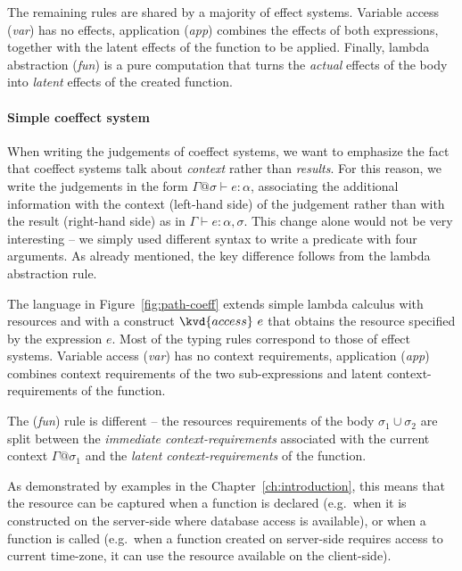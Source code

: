 The remaining rules are shared by a majority of effect systems. Variable access (\emph{var}) 
has no effects, application (\emph{app}) combines the effects of both expressions, together with 
the latent effects of the function to be applied. Finally, lambda abstraction (\emph{fun}) is a
pure computation that turns the \emph{actual} effects of the body into \emph{latent} effects of 
the created function.


\paragraph{Simple coeffect system}
When writing the judgements of coeffect systems, we want to emphasize the fact that coeffect 
systems talk about \emph{context} rather than \emph{results}. For this reason, we write the 
judgements in the form $\Gamma @ \sigma \vdash e : \alpha$, associating the additional information
with the context (left-hand side) of the judgement rather than with the result (right-hand side)
as in $\Gamma \vdash e : \alpha, \sigma$. This change alone would not be very interesting -- we 
simply used different syntax to write a predicate with four arguments. As already mentioned, the 
key difference follows from the lambda abstraction rule. 

The language in Figure~\ref{fig:path-coeff} extends simple lambda calculus with resources and
with a construct $\kvd{access}~e$ that obtains the resource specified by the expression $e$.
Most of the typing rules correspond to those of effect systems. Variable access (\emph{var}) 
has no context requirements, application (\emph{app}) combines context requirements of the two
sub-expressions and latent context-requirements of the function. 

The (\emph{fun}) rule is different -- the resources requirements of the body $\sigma_1 \cup \sigma_2$
are split between the \emph{immediate context-requirements} associated with the current context 
$\Gamma @ \sigma_1$ and the \emph{latent context-requirements} of the function.

As demonstrated by examples in the Chapter~\ref{ch:introduction}, this means that the resource
can be captured when a function is declared (e.g.~when it is constructed on the server-side
where database access is available), or when a function is called (e.g.~when a function created
on server-side requires access to current time-zone, it can use the resource available on the
client-side).

